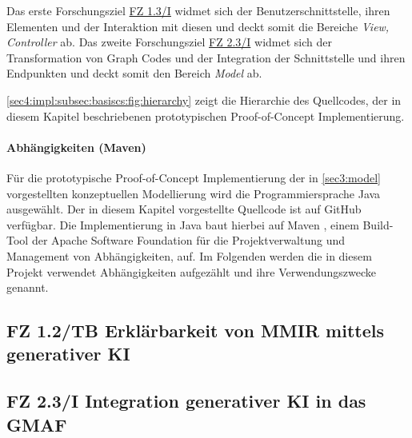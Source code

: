 Das erste Forschungsziel \hyperref[sec4:impl:subsec:fz-explainability]{FZ 1.3/I} widmet sich der Benutzerschnittstelle, ihren Elementen und der Interaktion mit diesen und deckt somit die Bereiche \textit{View, Controller} ab.
Das zweite Forschungsziel \hyperref[sec4:impl:subsec:fz-integration]{FZ 2.3/I} widmet sich der Transformation von Graph Codes und der Integration der Schnittstelle und ihren Endpunkten und deckt somit den Bereich \textit{Model} ab.

\cref{sec4:impl:subsec:basiscs:fig:hierarchy} zeigt die Hierarchie des Quellcodes, der in diesem Kapitel beschriebenen prototypischen Proof-of-Concept Implementierung.



\paragraph{Abhängigkeiten (Maven)}
Für die prototypische Proof-of-Concept Implementierung der in \cref{sec3:model} vorgestellten konzeptuellen Modellierung wird die Programmiersprache Java \cite{java} ausgewählt.
Der in diesem Kapitel vorgestellte Quellcode ist auf GitHub verfügbar.
Die Implementierung in Java baut hierbei auf Maven \cite{maven}, einem Build-Tool der Apache Software Foundation für die Projektverwaltung und Management von Abhängigkeiten, auf.
Im Folgenden werden die in diesem Projekt verwendet Abhängigkeiten aufgezählt und ihre Verwendungszwecke genannt.



\clearpage

\subsection[FZ 1.3/I Erklärbarkeit von MMIR mittels generativer KI]{\texorpdfstring{FZ 1.2/TB Erklärbarkeit von MMIR mittels \\ generativer KI}{FZ 1.3/I Erklärbarkeit von MMIR mittels generativer KI}}
\label{sec4:impl:subsec:fz-explainability}



\subsection{FZ 2.3/I Integration generativer KI in das GMAF}
\label{sec4:impl:subsec:fz-integration}

